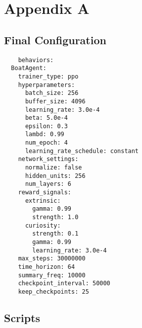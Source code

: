 %
%

\chapter{Appendix A}\label{app:app01}


\section{Final Configuration}\label{config}
\begin{adjustbox}{width=\textwidth/2}
\begin{lstlisting}
    behaviors:
  BoatAgent:
    trainer_type: ppo
    hyperparameters:
      batch_size: 256
      buffer_size: 4096
      learning_rate: 3.0e-4
      beta: 5.0e-4
      epsilon: 0.3
      lambd: 0.99
      num_epoch: 4
      learning_rate_schedule: constant
    network_settings:
      normalize: false
      hidden_units: 256
      num_layers: 6
    reward_signals:
      extrinsic:
        gamma: 0.99
        strength: 1.0
      curiosity:
        strength: 0.1
        gamma: 0.99
        learning_rate: 3.0e-4
    max_steps: 30000000
    time_horizon: 64
    summary_freq: 10000
    checkpoint_interval: 50000
    keep_checkpoints: 25
\end{lstlisting}
\end{adjustbox}

\section{Scripts}

  
  
